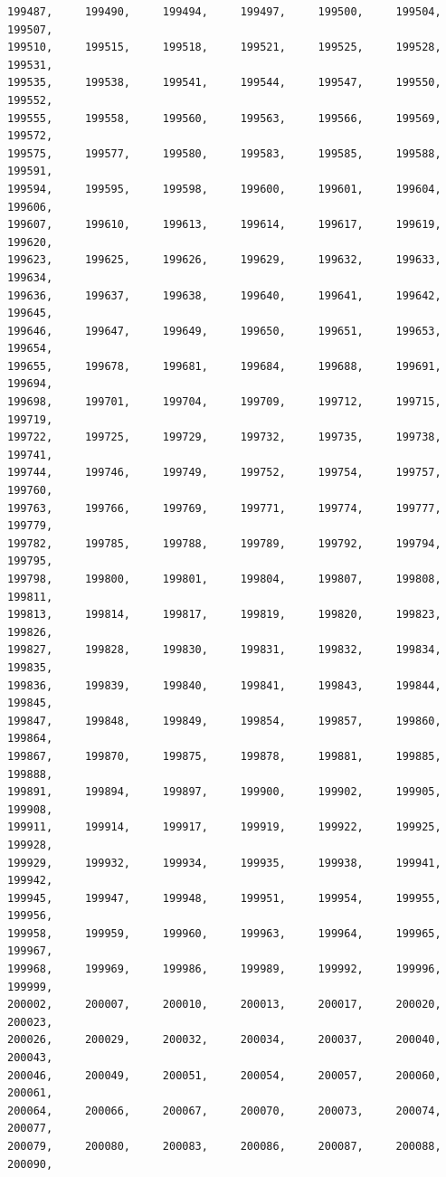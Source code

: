 \documentclass[a4paper,11pt]{report}
\begin{document}
\begin{verbatim}
199487,     199490,     199494,     199497,     199500,     199504,     199507,
199510,     199515,     199518,     199521,     199525,     199528,     199531,
199535,     199538,     199541,     199544,     199547,     199550,     199552,
199555,     199558,     199560,     199563,     199566,     199569,     199572,
199575,     199577,     199580,     199583,     199585,     199588,     199591,
199594,     199595,     199598,     199600,     199601,     199604,     199606,
199607,     199610,     199613,     199614,     199617,     199619,     199620,
199623,     199625,     199626,     199629,     199632,     199633,     199634,
199636,     199637,     199638,     199640,     199641,     199642,     199645,
199646,     199647,     199649,     199650,     199651,     199653,     199654,
199655,     199678,     199681,     199684,     199688,     199691,     199694,
199698,     199701,     199704,     199709,     199712,     199715,     199719,
199722,     199725,     199729,     199732,     199735,     199738,     199741,
199744,     199746,     199749,     199752,     199754,     199757,     199760,
199763,     199766,     199769,     199771,     199774,     199777,     199779,
199782,     199785,     199788,     199789,     199792,     199794,     199795,
199798,     199800,     199801,     199804,     199807,     199808,     199811,
199813,     199814,     199817,     199819,     199820,     199823,     199826,
199827,     199828,     199830,     199831,     199832,     199834,     199835,
199836,     199839,     199840,     199841,     199843,     199844,     199845,
199847,     199848,     199849,     199854,     199857,     199860,     199864,
199867,     199870,     199875,     199878,     199881,     199885,     199888,
199891,     199894,     199897,     199900,     199902,     199905,     199908,
199911,     199914,     199917,     199919,     199922,     199925,     199928,
199929,     199932,     199934,     199935,     199938,     199941,     199942,
199945,     199947,     199948,     199951,     199954,     199955,     199956,
199958,     199959,     199960,     199963,     199964,     199965,     199967,
199968,     199969,     199986,     199989,     199992,     199996,     199999,
200002,     200007,     200010,     200013,     200017,     200020,     200023,
200026,     200029,     200032,     200034,     200037,     200040,     200043,
200046,     200049,     200051,     200054,     200057,     200060,     200061,
200064,     200066,     200067,     200070,     200073,     200074,     200077,
200079,     200080,     200083,     200086,     200087,     200088,     200090,

\end{verbatim}
\end{document}
